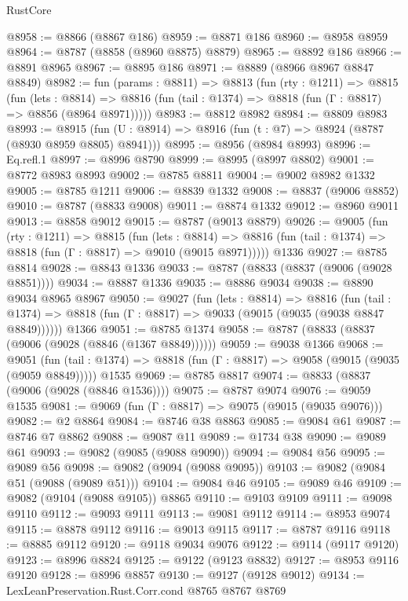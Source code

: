\begin{lexlean}{RustCore}
\begin{coremodule}
@8958 := @8866 (@8867 @186)
@8959 := @8871 @186
@8960 := @8958 @8959
@8964 := @8787 (@8858 (@8960 @8875) @8879)
@8965 := @8892 @186
@8966 := @8891 @8965
@8967 := @8895 @186
@8971 := @8889 (@8966 @8967 @8847 @8849)
@8982 := fun (params : @8811) =>
  @8813
    (fun (rty : @1211) =>
    @8815
      (fun (lets : @8814) =>
      @8816 (fun (tail : @1374) => @8818 (fun (Γ : @8817) => @8856 (@8964 @8971)))))
@8983 := @8812 @8982
@8984 := @8809 @8983
@8993 := @8915 (fun (U : @8914) => @8916 (fun (t : @7) => @8924 (@8787 (@8930 @8959 @8805) @8941)))
@8995 := @8956 (@8984 @8993)
@8996 := Eq.refl.{1}
@8997 := @8996 @8790
@8999 := @8995 (@8997 @8802)
@9001 := @8772 @8983 @8993
@9002 := @8785 @8811
@9004 := @9002 @8982 @1332
@9005 := @8785 @1211
@9006 := @8839 @1332
@9008 := @8837 (@9006 @8852)
@9010 := @8787 (@8833 @9008)
@9011 := @8874 @1332
@9012 := @8960 @9011
@9013 := @8858 @9012
@9015 := @8787 (@9013 @8879)
@9026 := @9005
    (fun (rty : @1211) =>
    @8815
      (fun (lets : @8814) =>
      @8816 (fun (tail : @1374) => @8818 (fun (Γ : @8817) => @9010 (@9015 @8971)))))
    @1336
@9027 := @8785 @8814
@9028 := @8843 @1336
@9033 := @8787 (@8833 (@8837 (@9006 (@9028 @8851))))
@9034 := @8887 @1336
@9035 := @8886 @9034
@9038 := @8890 @9034 @8965 @8967
@9050 := @9027
    (fun (lets : @8814) =>
    @8816
      (fun (tail : @1374) => @8818 (fun (Γ : @8817) => @9033 (@9015 (@9035 (@9038 @8847 @8849))))))
    @1366
@9051 := @8785 @1374
@9058 := @8787 (@8833 (@8837 (@9006 (@9028 (@8846 (@1367 @8849))))))
@9059 := @9038 @1366
@9068 := @9051
    (fun (tail : @1374) => @8818 (fun (Γ : @8817) => @9058 (@9015 (@9035 (@9059 @8849)))))
    @1535
@9069 := @8785 @8817
@9074 := @8833 (@8837 (@9006 (@9028 (@8846 @1536))))
@9075 := @8787 @9074
@9076 := @9059 @1535
@9081 := @9069 (fun (Γ : @8817) => @9075 (@9015 (@9035 @9076)))
@9082 := @2 @8864
@9084 := @8746 @38 @8863
@9085 := @9084 @61
@9087 := @8746 @7 @8862
@9088 := @9087 @11
@9089 := @1734 @38
@9090 := @9089 @61
@9093 := @9082 (@9085 (@9088 @9090))
@9094 := @9084 @56
@9095 := @9089 @56
@9098 := @9082 (@9094 (@9088 @9095))
@9103 := @9082 (@9084 @51 (@9088 (@9089 @51)))
@9104 := @9084 @46
@9105 := @9089 @46
@9109 := @9082 (@9104 (@9088 @9105)) @8865
@9110 := @9103 @9109
@9111 := @9098 @9110
@9112 := @9093 @9111
@9113 := @9081 @9112
@9114 := @8953 @9074
@9115 := @8878 @9112
@9116 := @9013 @9115
@9117 := @8787 @9116
@9118 := @8885 @9112
@9120 := @9118 @9034 @9076
@9122 := @9114 (@9117 @9120)
@9123 := @8996 @8824
@9125 := @9122 (@9123 @8832)
@9127 := @8953 @9116 @9120
@9128 := @8996 @8857
@9130 := @9127 (@9128 @9012)
@9134 := LexLeanPreservation.Rust.Corr.cond @8765 @8767 @8769

\end{coremodule}
\end{lexlean}
